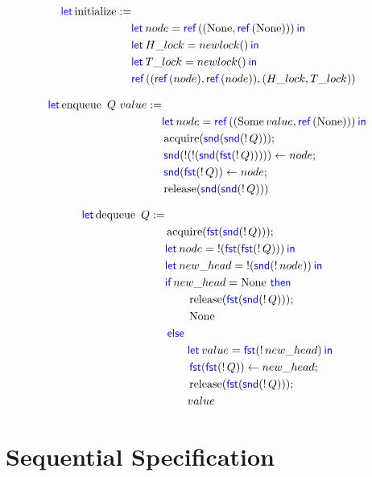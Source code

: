 \documentclass[twoside,11pt,openright]{report}
\newcommand{\acquire}{\operatorname{acquire}}
\newcommand{\release}{\operatorname{release}}
\newcommand{\initialise}{\operatorname{initialize}}
\newcommand{\enqueue}{\operatorname{enqueue}}
\newcommand{\dequeue}{\operatorname{dequeue}}
\begin{document}
\begin{align*}
  \langkw{let} \initialise := &\\
                    & \Let node = \Ref((\None, \Ref(\None))) in\\
                    & \Let H\_lock = newlock \TT in\\
                    & \Let T\_lock = newlock \TT in\\
                    & \Ref ((\Ref(node), \Ref(node)), (H\_lock, T\_lock))
\end{align*}

\begin{align*}
  \langkw{let} \enqueue \ Q \ value :=&\\
		& \Let node = \Ref ((\Some value, \Ref(\None))) in\\
		& \acquire (\Snd (\Snd (\deref Q)));\\
		& \Snd (\deref(\deref(\Snd (\Fst(\deref Q))))) \gets node;\\
		& \Snd (\Fst (\deref Q)) \gets node;\\
		& \release (\Snd (\Snd (\deref Q)))
\end{align*}

\begin{align*}
  \langkw{let} \dequeue \ Q :=&\\ 
		& \acquire (\Fst (\Snd (\deref Q)));\\
		& \Let node = \deref (\Fst (\Fst (\deref Q))) in\\
		& \Let new\_head = \deref (\Snd(\deref node)) in\\
		& \If new\_head = \None then\\
			& \hspace{20pt} \release (\Fst (\Snd(\deref Q)));\\
			& \hspace{20pt} \None\\
		& \Else\\
			& \hspace{20pt} \Let value = \Fst (\deref new\_head) in\\
			& \hspace{20pt} \Fst (\Fst (\deref Q)) \gets new\_head;\\
			& \hspace{20pt} \release (\Fst (\Snd (\deref Q)));\\
      & \hspace{20pt} value
\end{align*}


\section{Sequential Specification}
\end{document}
